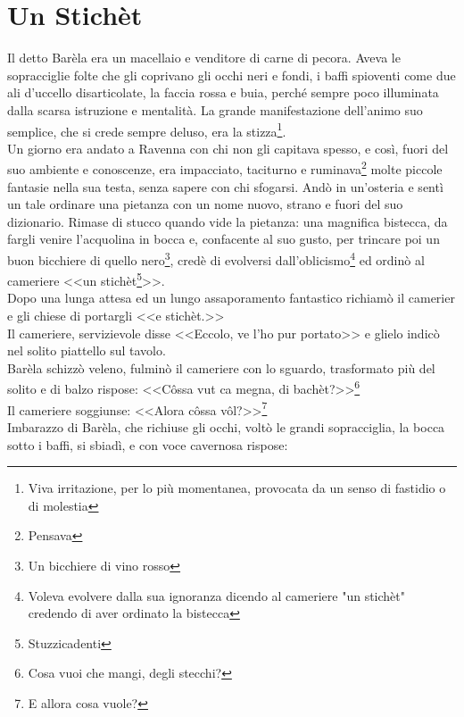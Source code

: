 
\chapter{Un Stichèt}
Il detto Barèla era un macellaio e venditore di carne di pecora. Aveva le sopracciglie folte che gli coprivano gli occhi neri e fondi, i baffi spioventi come due ali d'uccello disarticolate, la faccia rossa e buia, perché sempre poco illuminata dalla scarsa istruzione e mentalità. La grande manifestazione dell'animo suo semplice, che si crede sempre deluso, era la stizza\footnote{Viva irritazione, per lo più momentanea, provocata da un senso di fastidio o di molestia}.\\
\indent Un giorno era andato a Ravenna con chi non gli capitava spesso, e così, fuori del suo ambiente e conoscenze, era impacciato, taciturno e ruminava\footnote{Pensava} molte piccole fantasie nella sua testa, senza sapere con chi sfogarsi. Andò in un'osteria e sentì un tale ordinare una pietanza con un nome nuovo, strano e fuori del suo dizionario. Rimase di stucco quando vide la pietanza: una magnifica bistecca, da fargli venire l'acquolina in bocca e, confacente al suo gusto, per trincare poi un buon bicchiere di quello nero\footnote{Un bicchiere di vino rosso}, credè di evolversi dall'oblicismo\footnote{Voleva evolvere dalla sua ignoranza dicendo al cameriere "un stichèt" credendo di aver ordinato la bistecca} ed ordinò al cameriere <<un stichèt\footnote{Stuzzicadenti}>>. \\
\indent Dopo una lunga attesa ed un lungo assaporamento fantastico richiamò il camerier e gli chiese di portargli <<e stichèt.>>\\
\indent Il cameriere, servizievole disse <<Eccolo, ve l'ho pur portato>> e glielo indicò nel solito piattello sul tavolo.\\
Barèla schizzò veleno, fulminò il cameriere con lo sguardo, trasformato più del solito e di balzo rispose: <<Côssa vut ca megna, di bachèt?>>\footnote{Cosa vuoi che mangi, degli stecchi?}\\
\indent Il cameriere soggiunse: <<Alora côssa vôl?>>\footnote{E allora cosa vuole?}\\
\indent Imbarazzo di Barèla, che richiuse gli occhi, voltò le grandi sopracciglia, la bocca sotto i baffi, si sbiadì, e con voce cavernosa rispose: \\
